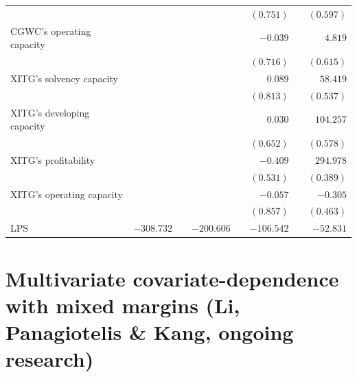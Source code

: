 \documentclass[10pt,aspectratio=169]{beamer}
\begin{document}
\begin{frame}
\begin{table}
\begin{center}
{\begin{tabular}{lrrrrrrr}
      &  &  &  &  & $(0.751)$  &  & $(0.597)$  \\
      \textsf{CGWC}'s operating capacity   &  &  &  &  & $-0.039$  &  & $4.819$ \\
      &  &  &  &  & $(0.716)$ &  & $(0.615)$ \\
      \textsf{XITG}'s solvency capacity  &  &  &  &  & $0.089$ &  & $58.419$ \\
      &  &  &  &  & $(0.813)$  &  & $(0.537)$  \\
      \textsf{XITG}'s developing capacity   &  &  &  &  & $0.030$ &  & $104.257$  \\
      &  &  &  &  & $(0.652)$ &  & $(0.578)$  \\
      \textsf{XITG}'s profitability  &  &  &  &  & $-0.409$  &  & $294.978$ \\
      &  &  &  &  & $(0.531)$ &  & $(0.389)$  \\
      \textsf{XITG}'s operating capacity   &  &  &  &  & $-0.057$  &  & $-0.305$ \\
      &  &  &  &  & $(0.857)$ &  & $(0.463)$  \\
      \midrule
      LPS  & $-308.732$ &  & $-200.606$ &  & $-106.542$ &  & $-52.831$   \\
      \bottomrule
    \end{tabular}
    }
  \end{center}
\end{table}

\end{frame}

\section{Multivariate covariate-dependence with mixed margins (Li, Panagiotelis \& Kang, ongoing
  research)}
\end{document}
